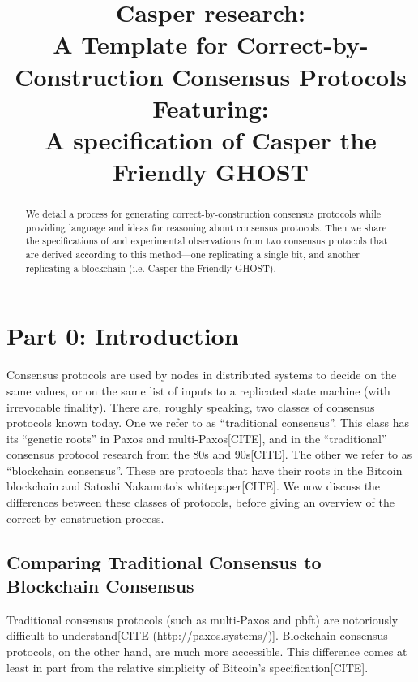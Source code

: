 \documentclass{article}
\theoremstyle{definition}
\begin{document}
\title{Casper research: \\ A Template for Correct-by-Construction Consensus Protocols \\ Featuring:\\ A specification of Casper the Friendly GHOST}
\maketitle

\begin{abstract}
We detail a process for generating correct-by-construction consensus protocols while providing language and ideas for reasoning about consensus protocols. Then we share the specifications of and experimental observations from two consensus protocols that are derived according to this method---one replicating a single bit, and another replicating a blockchain (i.e. Casper the Friendly GHOST).
\end{abstract}


\section{Part 0: Introduction}

Consensus protocols are used by nodes in distributed systems to decide on the same values, or on the same list of inputs to a replicated state machine (with irrevocable finality). There are, roughly speaking, two classes of consensus protocols known today. One we refer to as ``traditional consensus''. This class has its ``genetic roots'' in Paxos and multi-Paxos[CITE], and in the ``traditional'' consensus protocol research from the 80s and 90s[CITE]. The other we refer to as ``blockchain consensus''. These are protocols that have their roots in the Bitcoin blockchain and Satoshi Nakamoto's whitepaper[CITE]. We now discuss the differences between these classes of protocols, before giving an overview of the correct-by-construction process.

\subsection{Comparing Traditional Consensus to Blockchain Consensus}

Traditional consensus protocols (such as multi-Paxos and pbft) are notoriously difficult to understand[CITE (http://paxos.systems/)]. Blockchain consensus protocols, on the other hand, are much more accessible. This difference comes at least in part from the relative simplicity of Bitcoin's specification[CITE].
\end{document}
